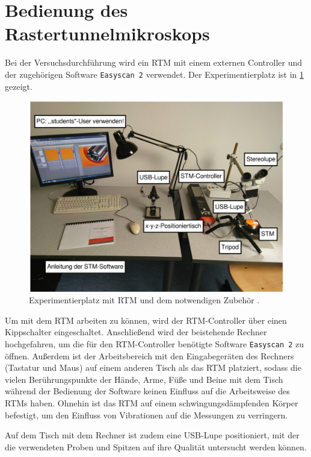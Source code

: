 \section{Bedienung des Rastertunnelmikroskops}\label{sec:versuch}
Bei der Versuchsdurchführung wird ein RTM mit einem externen Controller und der zugehörigen Software \texttt{Easyscan 2} verwendet.
Der Experimentierplatz ist in \cref{fig:versuchsplatz} gezeigt.
\begin{figure}[H]
	\centering
	\includegraphics[width=0.8\linewidth]{../figs/versuchsplatz.png}
	\caption{Experimentierplatz mit RTM und dem notwendigen Zubehör \cite{skript}.}
	\label{fig:versuchsplatz}
\end{figure}
Um mit dem RTM arbeiten zu können, wird der RTM-Controller über einen Kippschalter eingeschaltet. Anschließend wird der beistehende Rechner
hochgefahren, um die für den RTM-Controller benötigte Software \texttt{Easyscan 2} zu öffnen. Außerdem ist der Arbeitsbereich mit den Eingabegeräten
des Rechners (Tastatur und Maus) auf einem anderen Tisch als das RTM platziert, sodass die vielen Berührungspunkte der Hände, Arme, Füße und Beine mit dem Tisch während der Bedienung
der Software keinen Einfluss auf die Arbeitsweise des RTMs haben. Ohnehin ist das RTM auf einem schwingungsdämpfenden Körper befestigt, um
den Einfluss von Vibrationen auf die Messungen zu verringern. %
\par
Auf dem Tisch mit dem Rechner ist zudem eine USB-Lupe positioniert, mit der die verwendeten Proben und Spitzen auf ihre Qualität untersucht werden können.
